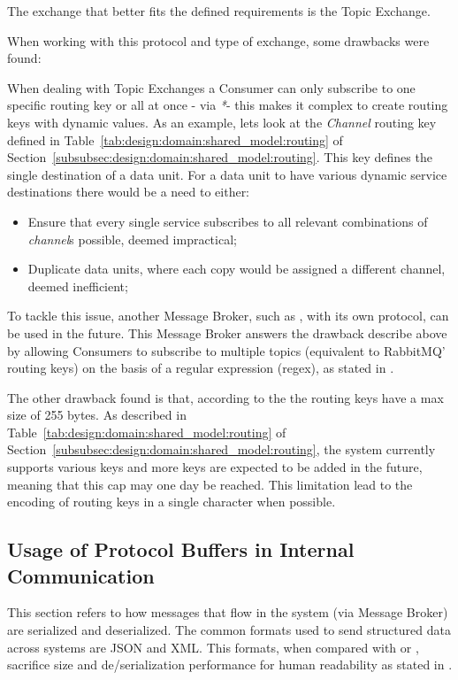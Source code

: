 The exchange that better fits the defined requirements is the Topic Exchange.

When working with this protocol and type of exchange, some drawbacks were found:

When dealing with Topic Exchanges a Consumer can only subscribe to one specific routing key or all at once - via \textit{*}- this makes it complex to create routing keys with dynamic values. As an example, lets look at the \textit{Channel} routing key defined in Table~\ref{tab:design:domain:shared_model:routing} of Section~\ref{subsubsec:design:domain:shared_model:routing}. This key defines the single destination of a data unit. For a data unit to have various dynamic service destinations there would be a need to either:

\begin{itemize}
    \item Ensure that every single service subscribes to all relevant combinations of \textit{channel}s possible, deemed impractical;
    \item Duplicate data units, where each copy would be assigned a different channel, deemed inefficient;
\end{itemize}

To tackle this issue, another Message Broker, such as , with its own protocol, can be used in the future. This Message Broker answers the drawback describe above by allowing Consumers to subscribe to multiple topics (equivalent to RabbitMQ' routing keys) on the basis of a regular expression (regex), as stated in .

The other drawback found is that, according to the  the routing keys have a max size of 255 bytes. As described in Table~\ref{tab:design:domain:shared_model:routing} of Section~\ref{subsubsec:design:domain:shared_model:routing}, the system currently supports various keys and more keys are expected to be added in the future, meaning that this cap may one day be reached. This limitation lead to the encoding of routing keys in a single character when possible.

\subsection{Usage of Protocol Buffers in Internal Communication}
\label{subsec:implementation:decisions:proto}

This section refers to how messages that flow in the system (via Message Broker) are serialized and deserialized. The common formats used to send structured data across systems are \gls{JSON} and \gls{XML}. This formats, when compared with  or , sacrifice size and de/serialization performance for human readability as stated in \cite{sumaray2012comparison}.

